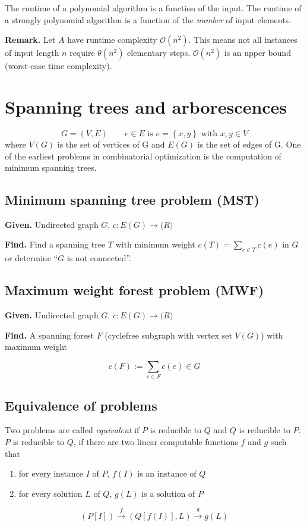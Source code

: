 \documentclass[a4paper]{article}
\theoremstyle{definition}
\newcommand{\set}[1]{\left\{#1\right\}}
\newcommand{\given}[1]{\textbf{Given.} #1\par}
\newcommand{\find}[1]{\textbf{Find.} #1\par}
\begin{document}
The runtime of a polynomial algorithm is a function of the input. The runtime of a strongly polynomial algorithm is a function of the \emph{number} of input elements.

\textbf{Remark.} Let $A$ have runtime complexity $\mathcal{O}(n^2)$. This means not all instances of input length $n$ require $\mathcal{\theta}(n^2)$ elementary steps. $\mathcal{O}(n^2)$ is an upper bound (worst-case time complexity).

\section{Spanning trees and arborescences}
%
\[
  G = (V, E) \qquad e \in E \text{ is } e = \set{x, y} \text{ with } x, y \in V
\]
where $V(G)$ is the set of vertices of G and $E(G)$ is the set of edges of G. One of the earliest problems in combinatorial optimization is the computation of minimum spanning trees.

\subsection{Minimum spanning tree problem (MST)}
%
\given{Undirected graph $G$, $c: E(G) \rightarrow \mathbb(R)$}
\find{Find a spanning tree $T$ with minimum weight $c(T) = \sum_{e \in T} c(e)$ in $G$ or determine ``$G$ is not connected''.}

\subsection{Maximum weight forest problem (MWF)}
%
\given{Undirected graph $G$, $c: E(G) \rightarrow \mathbb(R)$}
\find{A spanning forest $F$ (cyclefree subgraph with vertex set $V(G)$) with maximum weight}
\[
  c(F) := \sum_{e \in F} c(e) \in G
\]

\subsection{Equivalence of problems}
%
Two problems are called \emph{equivalent} if $P$ is reducible to $Q$ and $Q$ is reducible to $P$. $P$ is reducible to $Q$, if there are two linear computable functions $f$ and $g$ such that
\begin{enumerate}
  \item for every instance $I$ of $P$, $f(I)$ is an instance of $Q$
  \item for every solution $L$ of $Q$, $g(L)$ is a solution of $P$
\end{enumerate}
\[
  (P[I]) \xrightarrow{f} (Q[f(I)], L) \xrightarrow{g} g(L)
\]
\end{document}
